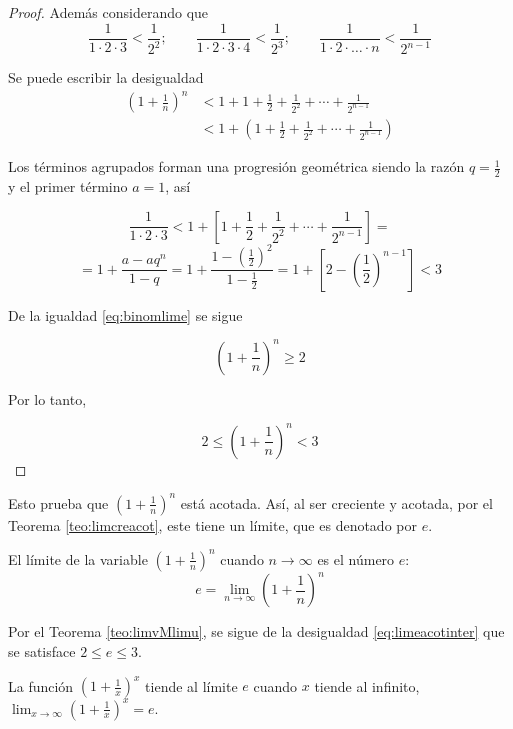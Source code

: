 \begin{proof}
  Además considerando que
  \[ \frac{1}{1 \cdot 2 \cdot 3} < \frac{1}{2^2}; \qquad
     \frac{1}{1 \cdot 2 \cdot 3 \cdot 4} < \frac{1}{2^3}; \qquad
     \frac{1}{1 \cdot 2 \cdot \ldots \cdot n} < \frac{1}{2^{n - 1}} \]

  Se puede escribir la desigualdad
  \begin{align*}
     \left( 1 + \frac{1}{n} \right)^n & < 1 + 1 + \frac{1}{2} + \frac{1}{2^2} + \cdots + \frac{1}{2^{n -1}}
     \\ &
     < 1 + \left( 1 + \frac{1}{2} + \frac{1}{2^2} + \cdots + \frac{1}{2^{n -1}} \right)
  \end{align*}

  Los términos agrupados forman una progresión geométrica siendo la razón \( q = \frac{1}{2} \) y el primer término \( a = 1 \), así

  \[ \frac{1}{1 \cdot 2 \cdot 3} < 1 + \left[ 1 + \frac{1}{2} + \frac{1}{2^2} + \cdots + \frac{1}{2^{n -1}} \right] = \]
  \[ = 1 + \frac{a - aq^n}{1 - q} = 1 + \frac{1 - \left(\frac{1}{2}\right)^2}{1 - \frac{1}{2}} = 1 + \left[ 2 - \left(\frac{1}{2}\right)^{n - 1} \right] < 3 \]

  De la igualdad \ref{eq:binomlime} se sigue

  \[ \left( 1 + \frac{1}{n} \right)^n \ge 2 \]

  Por lo tanto,

  \begin{equation} \label{eq:limeacotinter}
    2 \le \left( 1 + \frac{1}{n} \right)^n < 3
  \end{equation}
\end{proof}


Esto prueba que \( \left( 1 + \frac{1}{n} \right)^n \) está acotada. Así, al ser creciente y acotada, por el Teorema \ref{teo:limcreacot}, este tiene un límite, que es denotado por \(e\).


\begin{definition}
  El límite de la variable \( \left( 1 + \frac{1}{n} \right)^n \) cuando \( n \to \infty \) es el número \( e \):
  \[ e = \lim_{n \to \infty} \left( 1 + \frac{1}{n} \right)^n \]
\end{definition}


Por el Teorema \ref{teo:limvMlimu}, se sigue de la desigualdad \ref{eq:limeacotinter} que se satisface \( 2 \le e \le 3 \).


\begin{theorem}
  La función \( \left( 1 + \frac{1}{x} \right)^x \) tiende al límite \(e\) cuando \(x\) tiende al infinito, \( \lim_{x \to \infty} \left( 1 + \frac{1}{x} \right)^x = e \).
\end{theorem}


